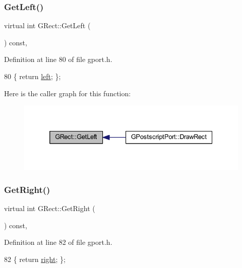 \subsubsection{\texorpdfstring{Get\+Left()}{GetLeft()}}
{\footnotesize\ttfamily virtual int G\+Rect\+::\+Get\+Left (\begin{DoxyParamCaption}{ }\end{DoxyParamCaption}) const\hspace{0.3cm}{\ttfamily [inline]}, {\ttfamily [virtual]}}



Definition at line 80 of file gport.\+h.


\begin{DoxyCode}
80 \{ \textcolor{keywordflow}{return} \mbox{\hyperlink{class_g_rect_ab848c49d0c6376f749a592042791b98b}{left}}; \};
\end{DoxyCode}
Here is the caller graph for this function\+:\nopagebreak
\begin{figure}[H]
\begin{center}
\leavevmode
\includegraphics[width=332pt]{class_g_rect_a2095ad1d204b942a45bc8ed1546df937_icgraph}
\end{center}
\end{figure}
\mbox{\label{class_g_rect_a3ba95d11e8a2760f1f7ba023dbfaf220}} 
\subsubsection{\texorpdfstring{Get\+Right()}{GetRight()}}
{\footnotesize\ttfamily virtual int G\+Rect\+::\+Get\+Right (\begin{DoxyParamCaption}{ }\end{DoxyParamCaption}) const\hspace{0.3cm}{\ttfamily [inline]}, {\ttfamily [virtual]}}



Definition at line 82 of file gport.\+h.


\begin{DoxyCode}
82 \{ \textcolor{keywordflow}{return} \mbox{\hyperlink{class_g_rect_a361868c6c368e642abcaf3e4823b1e70}{right}}; \};
\end{DoxyCode}
\mbox{\label{class_g_rect_ac346895770ff4c98c672485a05819f55}} 
